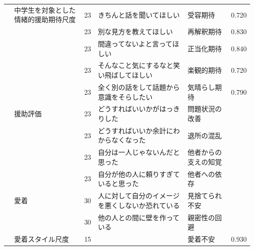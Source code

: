 \begin{landscape}
\begin{longtable}{p{2cm}p{2cm}p{2cm}p{6cm}p{2cm}p{2cm}}
		                         & 中学生を対象とした情緒的援助期待尺度               & 23  & きちんと話を聞いてほしい                                        & 受容期待                 & 0.720      \\
		                         &                                  & 23  & 別な見方を教えてほしい                                         & 再解釈期待                & 0.830      \\
		                         &                                  & 23  & 間違ってないよと言ってほしい                                      & 正当化期待                & 0.840      \\
		                         &                                  & 23  & そんなこと気にするなと笑い飛ばしてほしい                                & 楽観的期待                & 0.720      \\
		                         &                                  & 23  & 全く別の話をして話題から意識をそらしたい                                & 気晴らし期待               & 0.790      \\
		                         & 援助評価                             & 23  & どうすればいいかがはっきりした                                     & 問題状況の改善              &            \\
		                         &                                  & 23  & どうすればいいか余計にわからなくなった                                 & 退所の混乱                &            \\
		                         &                                  & 23  & 自分は一人じゃないんだと思った                                     & 他者からの支えの知覚           &            \\
		                         &                                  & 23  & 自分が他の人に頼りすぎていると思った                                  & 他者への依存               &            \\
		                         & 愛着                               & 30  & 人に対して自分のイメージを悪くしないか恐れている                            & 見捨てられ不安              &            \\
		                         &                                  & 30  & 他の人との間に壁を作っている                                      & 親密性の回避               &            \\
		\textcite{Kanemasa202192}   & 愛着スタイル尺度                         & 15  &                                                     & 愛着不安                 & 0.930      \\

\end{longtable}
\end{landscape}
